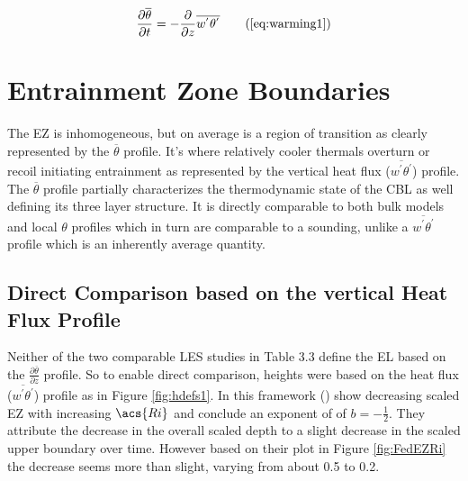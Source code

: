 \begin{equation}
\frac{\partial \overline{\theta}}{\partial t} = -\frac{\partial}{\partial z}\overline{w^{'}\theta^{'}} \tag{\ref{eq:warming1}}
\end{equation}

\section{Entrainment Zone Boundaries}
\label{sec:ezbound}
The \acs{EZ} is inhomogeneous, but on average is a region of transition as clearly represented by the $\overline{\theta}$ profile.  It's where relatively cooler thermals overturn or recoil initiating entrainment as represented by the vertical heat flux ($\overline{w^{'}\theta^{'}}$) profile.  The $\overline{\theta}$ profile partially characterizes the thermodynamic state of the \acs{CBL} as well defining its three layer structure.  It is directly comparable to both bulk models and local $\theta$ profiles which in turn are comparable to a sounding, unlike a $\overline{w^{'}\theta^{'}}$ profile which is an inherently average quantity.\\

\subsection{Direct Comparison based on the vertical Heat Flux Profile}

Neither of the two comparable \acs{LES} studies in Table 3.3 define the \acs{EL} based on the $\frac{\partial \overline{\theta}}{\partial z}$ profile.  So to enable direct comparison, heights were based on the heat flux ($\overline{w^{'}\theta^{'}}$) profile as in Figure \ref{fig:hdefs1}.  In this framework \citeauthor{FedConzMir04} (\citeyear{FedConzMir04}) show decreasing scaled \acs{EZ} with increasing $\acs{Ri}$ and conclude an exponent of of $b = -\frac{1}{2}$.  They attribute the decrease in the overall scaled depth to a slight decrease in the scaled upper boundary over time.  However based on their plot in Figure \ref{fig:FedEZRi} the decrease seems more than slight, varying from about 0.5 to 0.2.\\

